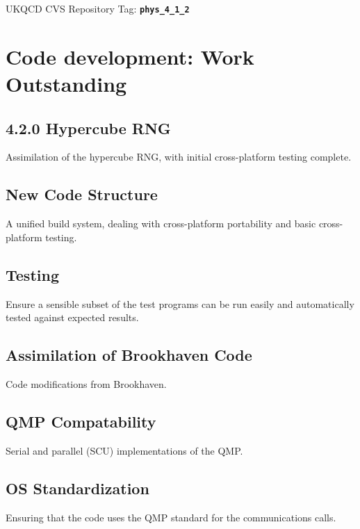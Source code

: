 \documentclass[12pt]{article}
\newcommand{\ukqcdtag}[1]{{\small{UKQCD CVS Repository Tag: }{\bf{\tt{#1}}}}}
\begin{document}
\ukqcdtag{phys\_4\_1\_2}

\section{Code development: Work Outstanding}

\subsection{4.2.0 Hypercube RNG}
Assimilation of the hypercube RNG, with initial cross-platform testing complete.

\subsection{New Code Structure}
A unified build system, dealing with cross-platform portability and basic 
cross-platform testing.

\subsection{Testing}
Ensure a sensible subset of the test programs can be run easily and
automatically tested against expected results.

\subsection{Assimilation of Brookhaven Code}
Code modifications from Brookhaven.

\subsection{QMP Compatability}
Serial and parallel (SCU) implementations of the QMP.

\subsection{OS Standardization}
Ensuring that the code uses the QMP standard for the communications calls.



\end{document}
